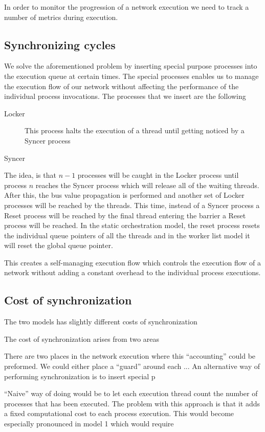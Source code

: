 In order to monitor the progression of a network execution we need to
track a number of metrics during execution.


\subsection{Synchronizing cycles}
We solve the aforementioned problem by inserting special purpose
processes into the execution queue at certain times. The special
processes enables us to manage the execution flow of our network
without affecting the performance of the individual process
invocations. The processes that we insert are the following

\begin{description}
\item[Locker] This process halts the execution of a thread until
  getting noticed by a Syncer process
\item[Syncer]
\end{description}


The idea, is that $n-1$ processes will be caught in the Locker process
until process $n$ reaches the Syncer process which will release all of
the waiting threads. After this, the bus value propagation is
performed and another set of Locker processes will be reached by the
threads. This time, instead of a Syncer process a Reset process will
be reached by the final thread entering the barrier a Reset process
will be reached. In the static orchestration model, the reset process
resets the individual queue pointers of all the threads and in the
worker list model it will reset the global queue pointer.

This creates a self-managing execution flow which controls the
execution flow of a network without adding a constant overhead to the
individual process executions.


\subsection{Cost of synchronization}
The two models has slightly different costs of synchronization

The cost of synchronization arises from two areas


There are two places in the network execution where this
``accounting'' could be preformed. We could either place a ``guard''
around each ... An alternative way of performing synchronization is to
insert special p

``Naive'' way of doing would be to let each execution thread count the
number of processes that has been executed. The problem with this
approach is that it adds a fixed computational cost to each process
execution. This would become especially pronounced in model 1
which would require 

